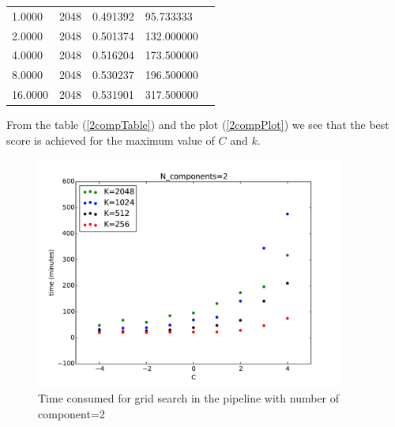 \documentclass[]{article}
\begin{document}
\begin{table}[]
\begin{tabular}{lllll}
1.0000  & 2048 & 0.491392 &  95.733333  \\                                                                            
2.0000  & 2048 & 0.501374 & 132.000000  \\                                                                            
4.0000  & 2048 & 0.516204 & 173.500000  \\                                                                            
8.0000  & 2048 & 0.530237 & 196.500000  \\                                                                            
16.0000 & 2048 & 0.531901 & 317.500000                                                                         
\end{tabular}
\end{table}



From the table (\ref{2compTable}) and the plot (\ref{2compPlot}) we see that the best score is achieved for the maximum value of $C$ and $k$.
 
\begin{center}
\begin{figure}\caption{Time consumed for grid search in the pipeline with number of component=2}\label{time2Components.png}
\includegraphics[height=3.0in]{plots/time2Components.pdf}
\end{figure}
\end{center}
\end{document}
